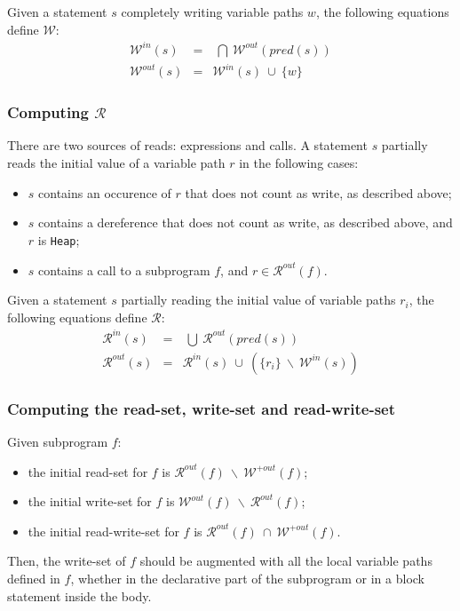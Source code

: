 \documentclass[fullpage]{article}
\newcommand{\code}[1]{\texttt{#1}}
\newcommand{\heap}{\code{Heap}\xspace}
\newcommand{\pred}[1]{\ensuremath{\mathit{pred}(#1)}\xspace}
\newcommand{\outallwrites}[1]{\ensuremath{\mathcal{W}^{+out}(#1)}\xspace}
\newcommand{\writes}{$\mathcal{W}$\xspace}
\newcommand{\inwrites}[1]{\ensuremath{\mathcal{W}^{in}(#1)}\xspace}
\newcommand{\outwrites}[1]{\ensuremath{\mathcal{W}^{out}(#1)}\xspace}
\newcommand{\reads}{$\mathcal{R}$\xspace}
\newcommand{\inreads}[1]{\ensuremath{\mathcal{R}^{in}(#1)}\xspace}
\newcommand{\outreads}[1]{\ensuremath{\mathcal{R}^{out}(#1)}\xspace}
\newcommand{\union}{~\cup~}
\newcommand{\bigunion}{~\bigcup~}
\newcommand{\inter}{~\cap~}
\newcommand{\biginter}{~\bigcap~}
\newcommand{\minus}{~\backslash~}
\begin{document}
Given a statement $s$ completely writing variable paths $w$, the following
equations define \writes:
\begin{eqnarray*}
\inwrites{s} &=& \biginter \outwrites{\pred{s}}\\
\outwrites{s} &=& \inwrites{s} \union \{w\}
\end{eqnarray*}

\subsubsection{Computing \reads}

There are two sources of reads: expressions and calls. A statement $s$
partially reads the initial value of a variable path $r$ in the following
cases:
\begin{itemize}
\item $s$ contains an occurence of $r$ that does not count as write, as
  described above;
\item $s$ contains a dereference that does not count as write, as described
  above, and $r$ is \heap;
\item $s$ contains a call to a subprogram $f$, and $r \in \outreads{f}$.
\end{itemize}

Given a statement $s$ partially reading the initial value of variable paths
$r_i$, the following equations define \reads:
\begin{eqnarray*}
\inreads{s} &=& \bigunion \outreads{\pred{s}}\\
\outreads{s} &=& \inreads{s} \union (\{r_i\} \minus \inwrites{s})
\end{eqnarray*}

\subsubsection{Computing the read-set, write-set and read-write-set}

Given subprogram $f$:
\begin{itemize}
\item the initial read-set for $f$ is $\outreads{f} \minus \outallwrites{f}$;
\item the initial write-set for $f$ is $\outwrites{f} \minus \outreads{f}$;
\item the initial read-write-set for $f$ is $\outreads{f} \inter
  \outallwrites{f}$.
\end{itemize}

Then, the write-set of $f$ should be augmented with all the local variable paths
defined in $f$, whether in the declarative part of the subprogram or in a block
statement inside the body.
\end{document}
